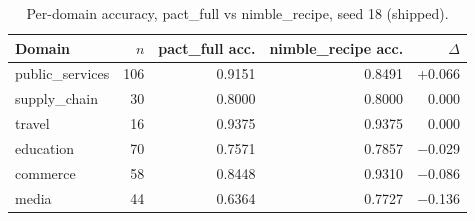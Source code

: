 \begin{table}[t]
\centering
\small
\begin{tabular}{lrrrr}
\toprule
Domain & $n$ & pact\_full acc. & nimble\_recipe acc. & $\Delta$ \\
\midrule
public\_services & 106 & 0.9151 & 0.8491 & +0.066 \\
supply\_chain & 30 & 0.8000 & 0.8000 & 0.000 \\
travel & 16 & 0.9375 & 0.9375 & 0.000 \\
education & 70 & 0.7571 & 0.7857 & $-$0.029 \\
commerce & 58 & 0.8448 & 0.9310 & $-$0.086 \\
media & 44 & 0.6364 & 0.7727 & $-$0.136 \\
\bottomrule
\end{tabular}
\caption{Per-domain accuracy, pact\_full vs nimble\_recipe, seed 18 (shipped).}
\label{tab:domain}
\end{table}
